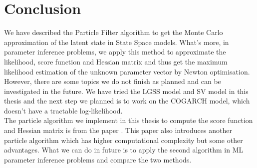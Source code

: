 \documentclass[mstat,12pt]{unswthesis}  %
\numberwithin{equation}{section}
\begin{document}
\chapter{Conclusion}\label{ccl}
We have described the Particle Filter algorithm  to get the Monte Carlo approximation of the latent state in State Space models. What's more, in parameter inference problems, we apply this method to approximate the likelihood, score function and  Hessian matrix and thus get the  maximum likelihood estimation of the unknown parameter  vector by Newton optimisation.\\

\noindent However, there are some topics we do not finish as planned and can be investigated in the future.
We have tried the LGSS model and SV model in this thesis and the next step we planned is to work on the COGARCH model, which doesn't have a tractable log-likelihood. \\

\noindent The particle algorithm we implement in this thesis to 
compute the score function and Hessian matrix is from
the paper \cite{poyiadjis2011particle}. This paper also introduces another particle algorithm which has higher computational complexity but some other advantages. 
What we can do in future is to apply the second algorithm
in ML parameter inference problems and compare the two methods.









\clearpage
{}

\end{document}
